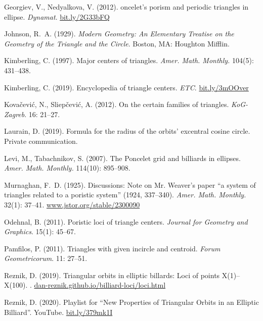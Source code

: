 \documentclass{amsart}
\theoremstyle{definition}
\begin{document}
\begin{thebibliography}{10}
Georgiev, V., Nedyalkova, V. (2012).
oncelet’s porism and periodic triangles in ellipse.
\newblock \emph{Dynamat}.
\newblock \url{bit.ly/2G33bFQ}

Johnson, R.~A. (1929).
\newblock \emph{Modern Geometry: An Elementary Treatise on the Geometry of the
  Triangle and the Circle}.
\newblock Boston, MA: Houghton Mifflin.

Kimberling, C. (1997).
\newblock Major centers of triangles.
\newblock \emph{Amer. Math. Monthly.} 104(5): 431--438.

Kimberling, C. (2019).
\newblock Encyclopedia of triangle centers.
\newblock \emph{ETC}.
\newblock \url{bit.ly/3mOOver}

Kova\v{c}evi\'c, N., Sliep\v{c}evi\'c, A. (2012).
\newblock On the certain families of triangles.
\newblock \emph{KoG-Zagreb}. 16: 21--27.

Laurain, D. (2019).
\newblock Formula for the radius of the orbits' excentral cosine circle.
\newblock Private communication.

Levi, M., Tabachnikov, S. (2007).
\newblock The {P}oncelet grid and billiards in ellipses.
\newblock \emph{Amer. Math. Monthly.} 114(10): 895--908.

Murnaghan, F.~D. (1925).
\newblock Discussions: Note on {Mr. Weaver}'s paper ``a system of triangles
  related to a poristic system'' (1924, 337--340).
\newblock \emph{Amer. Math. Monthly.} 32(1): 37--41.
\newblock \url{www.jstor.org/stable/2300090}

Odehnal, B. (2011).
\newblock Poristic loci of triangle centers.
\newblock \emph{Journal for Geometry and Graphics}. 15(1): 45--67.

Pamfilos, P. (2011).
\newblock Triangles with given incircle and centroid.
\newblock \emph{Forum Geometricorum}. 11: 27--51.

Reznik, D. (2019).
\newblock Triangular orbits in elliptic billards: Loci of points {X(1)--X(100)}.
.
\newblock \url{dan-reznik.github.io/billiard-loci/loci.html}

Reznik, D. (2020).
\newblock Playlist for {``New Properties of Triangular Orbits in an Elliptic
  Billiard''}.
\newblock YouTube.
\newblock \url{bit.ly/379mk1I}


\end{thebibliography}
\end{document}
